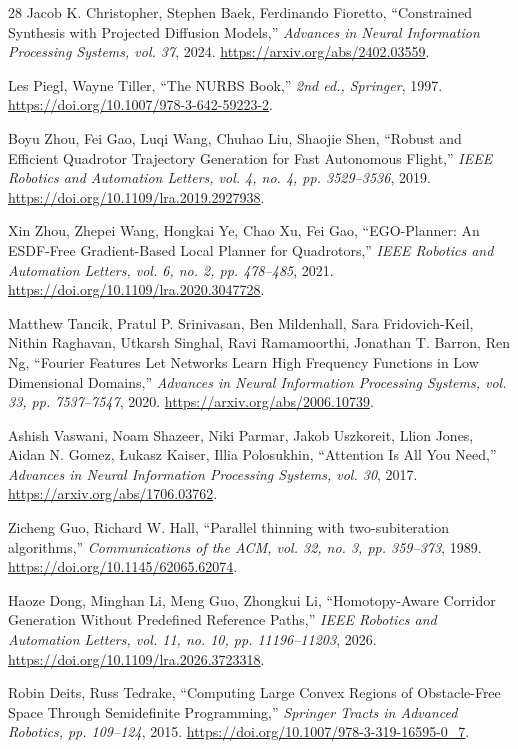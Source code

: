 \documentclass[journal]{IEEEtran}
\begin{document}
\begin{thebibliography}{28}
Jacob K. Christopher, Stephen Baek, Ferdinando Fioretto, ``Constrained Synthesis with Projected Diffusion Models,'' \emph{Advances in Neural Information Processing Systems, vol. 37}, 2024.
\url{https://arxiv.org/abs/2402.03559}.

Les Piegl, Wayne Tiller, ``The NURBS Book,'' \emph{2nd ed., Springer}, 1997.
\url{https://doi.org/10.1007/978-3-642-59223-2}.

Boyu Zhou, Fei Gao, Luqi Wang, Chuhao Liu, Shaojie Shen, ``Robust and Efficient Quadrotor Trajectory Generation for Fast Autonomous Flight,'' \emph{IEEE Robotics and Automation Letters, vol. 4, no. 4, pp. 3529--3536}, 2019.
\url{https://doi.org/10.1109/lra.2019.2927938}.

Xin Zhou, Zhepei Wang, Hongkai Ye, Chao Xu, Fei Gao, ``EGO-Planner: An ESDF-Free Gradient-Based Local Planner for Quadrotors,'' \emph{IEEE Robotics and Automation Letters, vol. 6, no. 2, pp. 478--485}, 2021.
\url{https://doi.org/10.1109/lra.2020.3047728}.

Matthew Tancik, Pratul P. Srinivasan, Ben Mildenhall, Sara Fridovich-Keil, Nithin Raghavan, Utkarsh Singhal, Ravi Ramamoorthi, Jonathan T. Barron, Ren Ng, ``Fourier Features Let Networks Learn High Frequency Functions in Low Dimensional Domains,'' \emph{Advances in Neural Information Processing Systems, vol. 33, pp. 7537--7547}, 2020.
\url{https://arxiv.org/abs/2006.10739}.

Ashish Vaswani, Noam Shazeer, Niki Parmar, Jakob Uszkoreit, Llion Jones, Aidan N. Gomez, \L{}ukasz Kaiser, Illia Polosukhin, ``Attention Is All You Need,'' \emph{Advances in Neural Information Processing Systems, vol. 30}, 2017.
\url{https://arxiv.org/abs/1706.03762}.

Zicheng Guo, Richard W. Hall, ``Parallel thinning with two-subiteration algorithms,'' \emph{Communications of the ACM, vol. 32, no. 3, pp. 359--373}, 1989.
\url{https://doi.org/10.1145/62065.62074}.

Haoze Dong, Minghan Li, Meng Guo, Zhongkui Li, ``Homotopy-Aware Corridor Generation Without Predefined Reference Paths,'' \emph{IEEE Robotics and Automation Letters, vol. 11, no. 10, pp. 11196--11203}, 2026.
\url{https://doi.org/10.1109/lra.2026.3723318}.

Robin Deits, Russ Tedrake, ``Computing Large Convex Regions of Obstacle-Free Space Through Semidefinite Programming,'' \emph{Springer Tracts in Advanced Robotics, pp. 109--124}, 2015.
\url{https://doi.org/10.1007/978-3-319-16595-0_7}.


\end{thebibliography}
\end{document}
